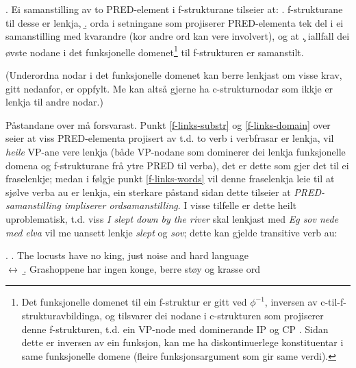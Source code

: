 \documentclass[11pt,a4paper,oneside,draft]{book}
\begin{document}
\ex. \label{f-links} Ei samanstilling av to PRED-element i f-strukturane tilseier at:
\a. \label{f-links-substr} f-strukturane til desse er lenkja,
\b. \label{f-links-words} orda i setningane som projiserer
   PRED-elementa tek del i ei samanstilling med kvarandre (kor andre
   ord kan vere involvert), og at
\c. \label{f-links-domain} iallfall dei øvste nodane i det funksjonelle
   domenet\footnote{Det funksjonelle domenet til ein f-struktur er gitt ved
 $\phi^{-1}$, inversen av c-til-f-strukturavbildinga, og tilsvarer dei
 nodane i c-strukturen som projiserer denne f-strukturen, t.d. ein
 VP-node med dominerande IP og CP
 \citep[s.~126]{bresnan2001lfs}. Sidan dette er inversen av ein
 funksjon, kan me ha diskontinuerlege konstituentar i same
 funksjonelle domene (fleire funksjonsargument som gir same verdi). } til f-strukturen er samanstilt.

(Underordna nodar i det funksjonelle domenet kan berre lenkjast om
visse krav, gitt nedanfor, er oppfylt. Me kan altså gjerne ha
c-strukturnodar som ikkje er lenkja til andre nodar.)


Påstandane over må forsvarast. Punkt \ref{f-links-substr} og
\ref{f-links-domain} over seier at viss PRED-elementa projisert av
t.d. to verb i verbfrasar er lenkja, vil \emph{heile} VP-ane vere lenkja
(både VP-nodane som dominerer dei lenkja funksjonelle domena og
f-strukturane frå ytre PRED til verba), det er dette som gjer det til
ei fraselenkje; medan i følgje punkt \ref{f-links-words} vil denne
fraselenkja leie til at sjølve verba au er lenkja, ein sterkare
påstand sidan dette tilseier at \emph{PRED-samanstilling impliserer ordsamanstilling}. I visse tilfelle er dette heilt uproblematisk,
t.d. viss \emph{I slept down by the river} skal lenkjast med \emph{Eg sov nede med elva} vil me uansett lenkje \emph{slept} og \emph{sov}; dette kan gjelde
transitive verb au:

\ex. \a. The locusts have no king, just noise and hard language\\
     $\leftrightarrow$
     \b. Grashoppene har ingen konge, berre støy og krasse ord


\end{document}

